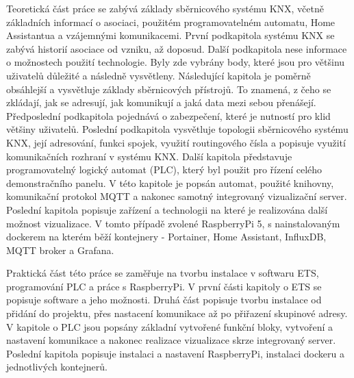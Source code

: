 Teoretická část práce se zabývá základy sběrnicového systému KNX, včetně základních informací o asociaci, použitém programovatelném automatu, Home Assistantua a vzájemnými komunikacemi. První podkapitola systému KNX se zabývá historií asociace od vzniku, až doposud. Další podkapitola nese informace o možnostech použití technologie. Byly zde vybrány body, které jsou pro většinu uživatelů důležité a následně vysvětleny. Následující kapitola je poměrně obsáhlejší a vysvětluje základy sběrnicových přístrojů. To znamená, z čeho se zkládají, jak se adresují, jak komunikují a jaká data mezi sebou přenášejí. Předposlední podkapitola pojednává o zabezpečení, které je nutností pro klid většiny uživatelů. Poslední podkapitola vysvětluje topologii sběrnicového systému KNX, její adresování, funkci spojek, využití routingového čísla a popisuje využití komunikačních rozhraní v systému KNX. Další kapitola představuje programovatelný logický automat (PLC), který byl použit pro řízení celého demonstračního panelu. V této kapitole je popsán automat, použité knihovny, komunikační protokol MQTT a nakonec samotný integrovaný vizualizační server. Poslední kapitola popisuje zařízení a technologii na které je realizována další možnost vizualizace. V tomto případě zvolené RaspberryPi 5, s nainstalovaným dockerem na kterém běží kontejnery - Portainer, Home Assistant, InfluxDB, MQTT broker a Grafana.  

Praktická část této práce se zaměřuje na tvorbu instalace v softwaru ETS, programování PLC a práce s RaspberryPi. V první části kapitoly o ETS se popisuje software a jeho možnosti. Druhá část popisuje tvorbu instalace od přidání do projektu, přes nastacení komunikace až po přiřazení skupinové adresy. V kapitole o PLC jsou popsány základní vytvořené funkční bloky, vytvoření a nastavení komunikace a nakonec realizace vizualizace skrze integrovaný server. Poslední kapitola popisuje instalaci a nastavení RaspberryPi, instalaci dockeru a jednotlivých kontejnerů.